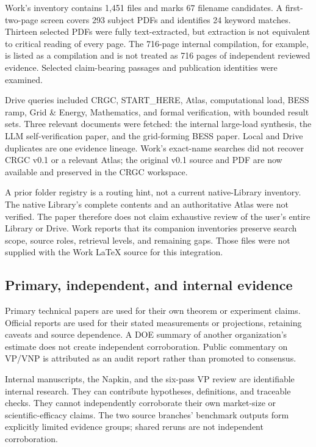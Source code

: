 \documentclass[11pt,letterpaper]{article}
\begin{document}
Work's inventory contains 1,451 files and marks 67 filename candidates. A first-two-page screen covers 293 subject PDFs and identifies 24 keyword matches. Thirteen selected PDFs were fully text-extracted, but extraction is not equivalent to critical reading of every page. The 716-page internal compilation, for example, is listed as a compilation and is not treated as 716 pages of independent reviewed evidence. Selected claim-bearing passages and publication identities were examined.

Drive queries included CRGC, START\_HERE, Atlas, computational load, BESS ramp, Grid \& Energy, Mathematics, and formal verification, with bounded result sets. Three relevant documents were fetched: the internal large-load synthesis, the LLM self-verification paper, and the grid-forming BESS paper. Local and Drive duplicates are one evidence lineage. Work's exact-name searches did not recover CRGC v0.1 or a relevant Atlas; the original v0.1 source and PDF are now available and preserved in the CRGC workspace.

A prior folder registry is a routing hint, not a current native-Library inventory. The native Library's complete contents and an authoritative Atlas were not verified. The paper therefore does not claim exhaustive review of the user's entire Library or Drive. Work reports that its companion inventories preserve search scope, source roles, retrieval levels, and remaining gaps. Those files were not supplied with the Work LaTeX source for this integration.

\subsection{Primary, independent, and internal evidence}
Primary technical papers are used for their own theorem or experiment claims. Official reports are used for their stated measurements or projections, retaining caveats and source dependence. A DOE summary of another organization's estimate does not create independent corroboration. Public commentary on VP/VNP is attributed as an audit report rather than promoted to consensus.

Internal manuscripts, the Napkin, and the six-pass VP review are identifiable internal research. They can contribute hypotheses, definitions, and traceable checks. They cannot independently corroborate their own market-size or scientific-efficacy claims. The two source branches' benchmark outputs form explicitly limited evidence groups; shared reruns are not independent corroboration.
\end{document}
